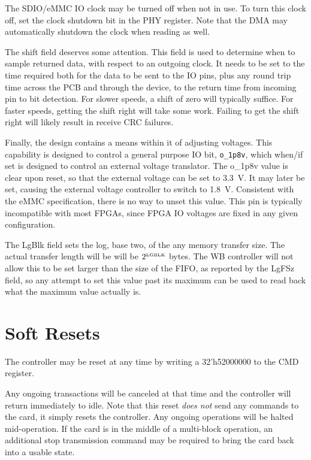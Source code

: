 \documentclass{gqtekspec}
\begin{document}
The SDIO/eMMC IO clock may be turned off when not in use.  To turn this clock
off, set the clock shutdown bit in the PHY register.  Note that the DMA may
automatically shutdown the clock when reading as well.

The shift field deserves some attention.  This field is used to determine
when to sample returned data, with respect to an outgoing clock.  It needs to
be set to the time required both for the data to be sent to the IO pins, plus
any round trip time across the PCB and through the device, to the return
time from incoming pin to bit detection.  For slower speeds, a shift of zero
will typically suffice.  For faster speeds, getting the shift right will take
some work.  Failing to get the shift right will likely result in receive CRC
failures.

Finally, the design contains a means within it of adjusting voltages.  This
capability is designed to control a general purpose IO bit, {\tt o\_1p8v},
which when/if set is designed to control an external voltage translator.
The {o\_1p8v} value is clear upon reset, so that the external voltage can
be set to 3.3~V.  It may later be set, causing the external voltage controller
to switch to 1.8~V.  Consistent with the eMMC specification, there is no way
to unset this value.  This pin is typically incompatible with most FPGAs, since
FPGA IO voltages are fixed in any given configuration.

The LgBlk field sets the log, base two, of the any memory transfer size.  The
actual transfer length will be will be $2^{\mbox{\tiny LGBLK}}$ bytes.  The
WB controller will not allow this to be set larger than the size of the FIFO,
as reported by the LgFSz field, so any attempt to set this value past its
maximum can be used to read back what the maximum value actually is.
\section{Soft Resets}
The controller may be reset at any time by writing a 32'h52000000 to the
CMD register.

Any ongoing transactions will be canceled at that time and the controller will
return immediately to idle.  Note that this reset {\em does not} send any
commands to the card, it simply resets the controller.  Any ongoing operations
will be halted mid-operation.  If the card is in the middle of a multi-block
operation, an additional stop transmission command may be required to bring
the card back into a usable state.
\end{document}
